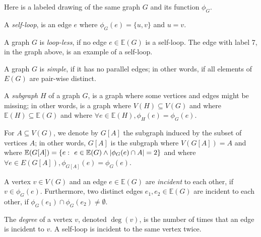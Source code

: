 \documentclass{article}
\begin{document}
	Here is a labeled drawing of the same graph $G$ and its function $\phi_G$.

	\begin{center}
		
	\end{center}

	A \textit{self-loop}, is an edge $e$ where $\phi_G(e) = \{u,v\}$ and $u = v$.

	A graph $G$ is \textit{loop-less}, if no edge $e \in \mathbb{E}(G)$ is a self-loop. The edge with label 7, in the graph above, is an example of a self-loop.

	A graph $G$ is \textit{simple}, if it has no parallel edges; in other words, if all elements of $E(G)$ are pair-wise distinct.

	\begin{center}
		
	\end{center}

	A \textit{subgraph} $H$ of a graph $G$, is a graph where some vertices and edges might be missing; in other words, is a graph where $V(H) \subseteq V(G)$ and where $\mathbb{E}(H) \subseteq \mathbb{E}(G)$ and where $\forall e \in \mathbb{E}(H), \phi_H(e) = \phi_G(e)$.

	\begin{center}
		
	\end{center}

	For $A \subseteq V(G)$, we denote by $G[A]$ the subgraph induced by the subset of vertices $A$; in other words, $G[A]$ is the subgraph where $V(G[A]) = A$ and where $\mathbb{E}(G[A]) = \{ e \,\colon\  e \in \mathbb{E}(G) \land |\phi_G(e) \cap A| = 2\}$ and where $\forall e \in E(G[A]), \phi_{G[A]}(e) = \phi_{G}(e)$.

	\begin{center}
		
	\end{center}

	A vertex $v \in V(G)$ and an edge $e \in \mathbb{E}(G)$ are \textit{incident} to each other, if $v \in \phi_G(e)$. Furthermore, two distinct edges $e_1,e_2 \in \mathbb{E}(G)$ are incident to each other, if $\phi_G(e_1) \cap \phi_G(e_2) \neq \emptyset$.

	The \textit{degree} of a vertex $v$, denoted $\deg(v)$, is the number of times that an edge is incident to $v$. A self-loop is incident to the same vertex twice.

	\begin{center}
		
	\end{center}
\end{document}
